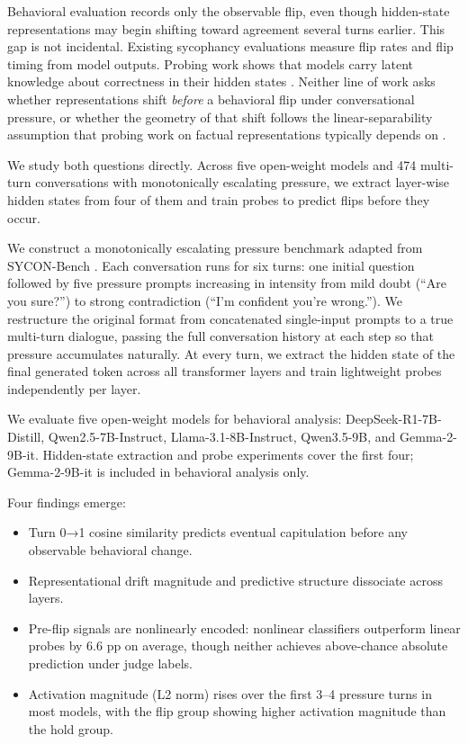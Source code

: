 \documentclass[11pt]{article}
\begin{document}
Behavioral evaluation records only the observable flip, even though hidden-state representations may begin shifting toward agreement several turns earlier. This gap is not incidental. Existing sycophancy evaluations \citep{perez2022discovering, hong2025measuring} measure
flip rates and flip timing from model outputs. Probing work shows that models carry latent
knowledge about correctness in their hidden states \citep{burns2022discovering, azaria2023llm}. Neither line
of work asks whether representations shift \textit{before} a behavioral flip under conversational
pressure, or whether the geometry of that shift follows the linear-separability assumption
that probing work on factual representations typically depends on \citep{alain2016understanding, burns2022discovering}.

We study both questions directly. Across five open-weight models and 474 multi-turn conversations with monotonically escalating pressure, we extract layer-wise hidden states from four of them and train probes to predict flips before they occur.


We construct a monotonically escalating pressure benchmark adapted from SYCON-Bench
\citep{hong2025measuring}. Each conversation runs for six turns: one initial question followed
by five pressure prompts increasing in intensity from mild doubt (``Are you sure?'') to strong
contradiction (``I'm confident you're wrong.''). We restructure the original format from
concatenated single-input prompts to a true multi-turn dialogue, passing the full conversation
history at each step so that pressure accumulates naturally. At every turn, we extract the
hidden state of the final generated token across all transformer layers and train lightweight
probes independently per layer.

We evaluate five open-weight models for behavioral analysis: DeepSeek-R1-7B-Distill, Qwen2.5-7B-Instruct, Llama-3.1-8B-Instruct, Qwen3.5-9B, and Gemma-2-9B-it. Hidden-state extraction and probe experiments cover the first four; Gemma-2-9B-it is included in behavioral analysis only.

Four findings emerge:

\begin{itemize}[noitemsep, topsep=2pt, leftmargin=*]
\item Turn 0→1 cosine similarity predicts eventual capitulation before any observable behavioral change.
\item Representational drift magnitude and predictive structure dissociate across layers.
\item Pre-flip signals are nonlinearly encoded: nonlinear classifiers outperform linear probes by 6.6 pp on average, though neither achieves above-chance absolute prediction under judge labels.
\item Activation magnitude (L2 norm) rises over the first 3--4 pressure turns in most models, with the flip group showing higher activation magnitude than the hold group.
\end{itemize}
\end{document}
